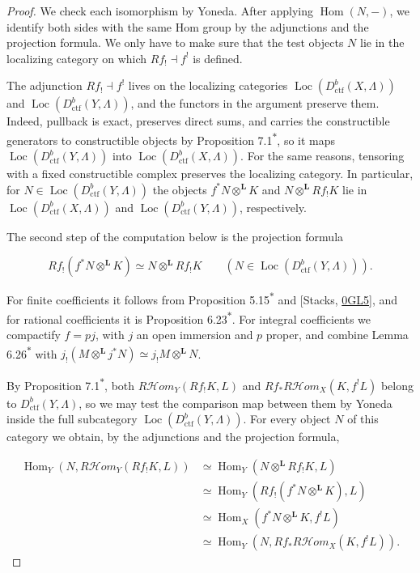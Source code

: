 \documentclass[11pt]{article}
\newcommand{\bpout}[1]{#1\textsuperscript{\hyperlink{bp-outside}{\ensuremath{\ast}}}}
\providecommand{\Hom}{}\renewcommand{\Hom}{\operatorname{Hom}}
\providecommand{\Loc}{}\renewcommand{\Loc}{\operatorname{Loc}}
\providecommand{\cHom}{}\renewcommand{\cHom}{R\mathcal{H}\!om}
\begin{document}
\begin{proof}[{Proof}]\label{bp11}%
We check each isomorphism by Yoneda. After applying \(\Hom(N,-)\), we identify both sides with the same Hom group by the adjunctions and the projection formula. We only have to make sure that the test objects \(N\) lie in the localizing category on which \(Rf_!\dashv f^!\) is defined.

The adjunction \(Rf_!\dashv f^!\) lives on the localizing categories \(\Loc(D^b_{\mathrm{ctf}}(X,\Lambda))\) and \(\Loc(D^b_{\mathrm{ctf}}(Y,\Lambda))\), and the functors in the argument preserve them. Indeed, pullback is exact, preserves direct sums, and carries the constructible generators to constructible objects by Proposition \bpout{7.1}, so it maps \(\Loc(D^b_{\mathrm{ctf}}(Y,\Lambda))\) into \(\Loc(D^b_{\mathrm{ctf}}(X,\Lambda))\). For the same reasons, tensoring with a fixed constructible complex preserves the localizing category. In particular, for \(N\in\Loc(D^b_{\mathrm{ctf}}(Y,\Lambda))\) the objects \(f^*N\otimes^{\mathbf L}K\) and \(N\otimes^{\mathbf L}Rf_!K\) lie in \(\Loc(D^b_{\mathrm{ctf}}(X,\Lambda))\) and \(\Loc(D^b_{\mathrm{ctf}}(Y,\Lambda))\), respectively.

The second step of the computation below is the projection formula

\[
Rf_!(f^*N\otimes^{\mathbf L}K)\simeq N\otimes^{\mathbf L}Rf_!K
\qquad(N\in\Loc(D^b_{\mathrm{ctf}}(Y,\Lambda))).
\]

For finite coefficients it follows from Proposition \bpout{5.15} and [Stacks, \href{https://stacks.math.columbia.edu/tag/0GL5}{0GL5}], and for rational coefficients it is Proposition \bpout{6.23}. For integral coefficients we compactify \(f=pj\), with \(j\) an open immersion and \(p\) proper, and combine Lemma \bpout{6.26} with \(j_!(M\otimes^{\mathbf L}j^*N)
 \simeq j_!M\otimes^{\mathbf L}N\).

By Proposition \bpout{7.1}, both \(\cHom_Y(Rf_!K,L)\) and \(Rf_*\cHom_X(K,f^!L)\) belong to \(D^b_{\mathrm{ctf}}(Y,\Lambda)\), so we may test the comparison map between them by Yoneda inside the full subcategory \(\Loc(D^b_{\mathrm{ctf}}(Y,\Lambda))\). For every object \(N\) of this category we obtain, by the adjunctions and the projection formula,

\[
\begin{aligned}
\Hom_Y(N,\cHom_Y(Rf_!K,L))
&\simeq\Hom_Y(N\otimes^{\mathbf L}Rf_!K,L)\\
&\simeq\Hom_Y(Rf_!(f^*N\otimes^{\mathbf L}K),L)\\
&\simeq\Hom_X(f^*N\otimes^{\mathbf L}K,f^!L)\\
&\simeq\Hom_Y(N,Rf_*\cHom_X(K,f^!L)).
\end{aligned}
\]


\end{proof}
\end{document}
